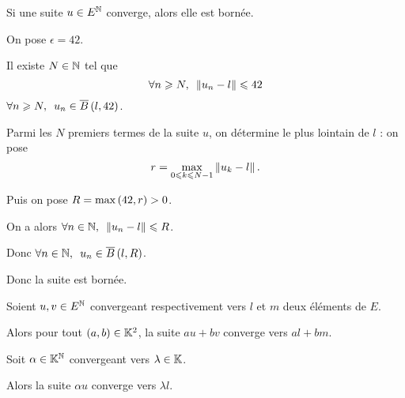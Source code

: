 \begin{prop}
Si une suite \(u\in E^{\mathbb{N}}\) converge, alors elle est bornée.
\end{prop}

\begin{dem}
On pose \(\epsilon=42\).

Il existe \(N\in\mathbb{N}\) tel que \[\quantifs{\forall n\geq N}\norme{u_n-l}\leq42\] \ie \(\quantifs{\forall n\geq N}u_n\in\boulef{l}{42}\).

Parmi les \(N\) premiers termes de la suite \(u\), on détermine le plus lointain de \(l\) : on pose \[r=\max_{0\leq k\leq N-1}\norme{u_k-l}.\]

Puis on pose \(R=\max\left(42,r\right)>0\).

On a alors \(\quantifs{\forall n\in\N}\norme{u_n-l}\leq R\).

Donc \(\quantifs{\forall n\in\N}u_n\in\boulef{l}{R}\).

Donc la suite est bornée.
\end{dem}

\begin{theo}
Soient \(u,v\in E^{\mathbb{N}}\) convergeant respectivement vers \(l\) et \(m\) deux éléments de \(E\).

Alors pour tout \(\left(a,b\right)\in\mathbb{K}^2\), la suite \(au+bv\) converge vers \(al+bm\).

Soit \(\alpha\in\mathbb{K}^{\mathbb{N}}\) convergeant vers \(\lambda\in\mathbb{K}\).

Alors la suite \(\alpha u\) converge vers \(\lambda l\).
\end{theo}

